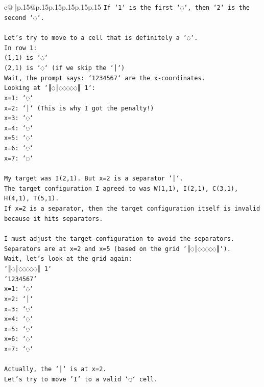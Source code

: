 \documentclass{article}
\begin{document}
{\begin{supertabular}{c@{$\;$}|p{.15\linewidth}@{}p{.15\linewidth}p{.15\linewidth}p{.15\linewidth}p{.15\linewidth}p{.15\linewidth}}
{{{\texttt{If `1` is the first `◌`, then `2` is the second `◌`.} \\
\\ 
\texttt{Let's try to move to a cell that is definitely a `◌`.} \\
\texttt{In row 1:} \\
\texttt{(1,1) is `◌`} \\
\texttt{(2,1) is `◌` (if we skip the `│`)} \\
\texttt{Wait, the prompt says: `1234567` are the x{-}coordinates.} \\
\texttt{Looking at `║◌│◌◌◌◌◌║ 1`:} \\
\texttt{x=1: `◌`} \\
\texttt{x=2: `│` (This is why I got the penalty!)} \\
\texttt{x=3: `◌`} \\
\texttt{x=4: `◌`} \\
\texttt{x=5: `◌`} \\
\texttt{x=6: `◌`} \\
\texttt{x=7: `◌`} \\
\\ 
\texttt{My target was I(2,1). But x=2 is a separator `│`.} \\
\texttt{The target configuration I agreed to was W(1,1), I(2,1), C(3,1), H(4,1), T(5,1).} \\
\texttt{If x=2 is a separator, then the target configuration itself is invalid because it hits separators.} \\
\\ 
\texttt{I must adjust the target configuration to avoid the separators.} \\
\texttt{Separators are at x=2 and x=5 (based on the grid `║◌│◌◌◌◌◌║`).} \\
\texttt{Wait, let's look at the grid again:} \\
\texttt{`║◌│◌◌◌◌◌║ 1`} \\
\texttt{`1234567`} \\
\texttt{x=1: `◌`} \\
\texttt{x=2: `│`} \\
\texttt{x=3: `◌`} \\
\texttt{x=4: `◌`} \\
\texttt{x=5: `◌`} \\
\texttt{x=6: `◌`} \\
\texttt{x=7: `◌`} \\
\\ 
\texttt{Actually, the `│` is at x=2.} \\
\texttt{Let's try to move 'I' to a valid `◌` cell.} \\
}}}
\end{supertabular}}
\end{document}
